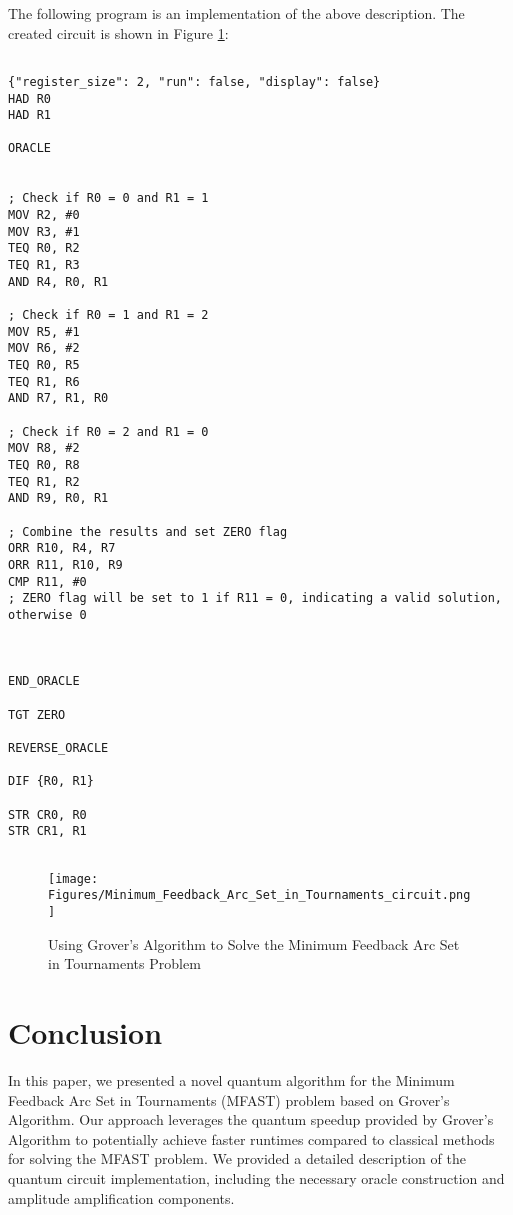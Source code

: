 \begin{enumerate}
The following program is an implementation of the above description. The created circuit is shown in Figure \ref{fig:Minimum_Feedback_Arc_Set_in_Tournaments}:

\begin{lstlisting}

{"register_size": 2, "run": false, "display": false}
HAD R0
HAD R1

ORACLE


; Check if R0 = 0 and R1 = 1
MOV R2, #0
MOV R3, #1
TEQ R0, R2
TEQ R1, R3
AND R4, R0, R1

; Check if R0 = 1 and R1 = 2
MOV R5, #1
MOV R6, #2
TEQ R0, R5
TEQ R1, R6
AND R7, R1, R0

; Check if R0 = 2 and R1 = 0
MOV R8, #2
TEQ R0, R8
TEQ R1, R2
AND R9, R0, R1

; Combine the results and set ZERO flag
ORR R10, R4, R7
ORR R11, R10, R9
CMP R11, #0
; ZERO flag will be set to 1 if R11 = 0, indicating a valid solution, otherwise 0



END_ORACLE

TGT ZERO

REVERSE_ORACLE

DIF {R0, R1}

STR CR0, R0
STR CR1, R1


\end{lstlisting}

\begin{figure}[htp]
    \centering
    \texttt{[image: Figures/Minimum\_Feedback\_Arc\_Set\_in\_Tournaments\_circuit.png]}
    \caption{Using Grover's Algorithm to Solve the Minimum Feedback Arc Set in Tournaments Problem}
    \label{fig:Minimum_Feedback_Arc_Set_in_Tournaments}
\end{figure}

\section{Conclusion}
\label{sec:conclusion}

In this paper, we presented a novel quantum algorithm for the Minimum Feedback Arc Set in Tournaments (MFAST) problem based on Grover's Algorithm. Our approach leverages the quantum speedup provided by Grover's Algorithm to potentially achieve faster runtimes compared to classical methods for solving the MFAST problem. We provided a detailed description of the quantum circuit implementation, including the necessary oracle construction and amplitude amplification components.


\end{enumerate}

